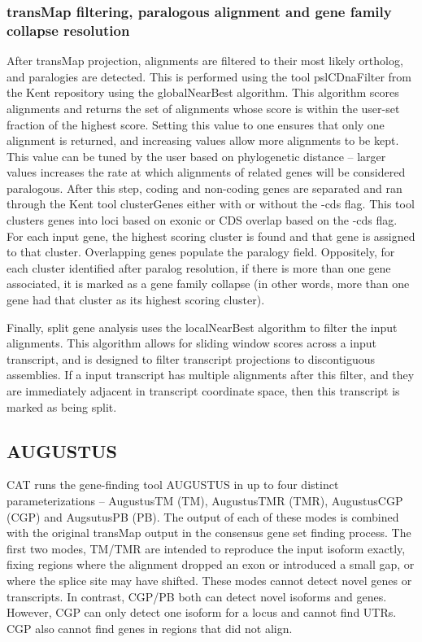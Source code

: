 \subsubsection*{transMap filtering, paralogous alignment and gene family collapse resolution}
	After transMap projection, alignments are filtered to their most likely ortholog, and paralogies are detected. This is performed using the tool pslCDnaFilter from the Kent repository using the globalNearBest algorithm. This algorithm scores alignments and returns the set of alignments whose score is within the user-set fraction of the highest score. Setting this value to one ensures that only one alignment is returned, and increasing values allow more alignments to be kept. This value can be tuned by the user based on phylogenetic distance -- larger values increases the rate at which alignments of related genes will be considered paralogous. After this step, coding and non-coding genes are separated and ran through the Kent tool clusterGenes either with or without the -cds flag. This tool clusters genes into loci based on exonic or CDS overlap based on the -cds flag. For each input gene, the highest scoring cluster is found and that gene is assigned to that cluster. Overlapping genes populate the paralogy field. Oppositely, for each cluster identified after paralog resolution, if there is more than one gene associated, it is marked as a gene family collapse (in other words, more than one gene had that cluster as its highest scoring cluster).
    
    Finally, split gene analysis uses the localNearBest algorithm to filter the input alignments. This algorithm allows for sliding window scores across a input transcript, and is designed to filter transcript projections to discontiguous assemblies. If a input transcript has multiple alignments after this filter, and they are immediately adjacent in transcript coordinate space, then this transcript is marked as being split.

\subsection*{AUGUSTUS}
	CAT runs the gene-finding tool AUGUSTUS in up to four distinct parameterizations -- AugustusTM (TM), AugustusTMR (TMR), AugustusCGP (CGP) and AugsutusPB (PB). The output of each of these modes is combined with the original transMap output in the consensus gene set finding process. The first two modes, TM/TMR are intended to reproduce the input isoform exactly, fixing regions where the alignment dropped an exon or introduced a small gap, or where the splice site may have shifted. These modes cannot detect novel genes or transcripts. In contrast, CGP/PB both can detect novel isoforms and genes. However, CGP can only detect one isoform for a locus and cannot find UTRs. CGP also cannot find genes in regions that did not align. 
  
